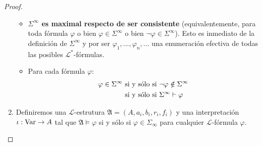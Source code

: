 \documentclass[12pt]{report}
\newcounter{it}
\theoremstyle{largebreak}
\newcommand\cf[3]{\ensuremath{#1:#2\rightarrow#3}}
\begin{document}
\begin{proof}
\begin{enumerate}[label = \textit{(\alph*)}]
\begin{itemize}
                \item \textbf{$\Sigma^\infty$ es maximal respecto de ser consistente} (equivalentemente, para toda fórmula $\varphi$ o bien $\varphi\in\Sigma^\infty$ o bien $\neg\varphi\in\Sigma^\infty$). Esto es inmediato de la definición de $\Sigma^\infty$ y por ser $\varphi_1,...,\varphi_n,...$ una enumeración efectiva de todas las posibles $\mathcal{L}^*$-fórmulas.
                \item Para cada fórmula $\varphi$:
                \begin{equation*}
                    \begin{split}
                        \varphi\in\Sigma^\infty &\textup{ si y sólo si }\neg\varphi\notin\Sigma^\infty\\
                        &\textup{ si y sólo si }\Sigma^\infty\vdash\varphi \\
                    \end{split}
                \end{equation*}
            \end{itemize}
            \item Definiremos una $\mathcal{L}$-estrutura $\mathfrak{A}=\left(A,a_i,b_i,r_i,f_i \right)$ y una interpretación $\cf{\iota}{\textup{Var}}{A}$ tal que $\mathfrak{A}\vDash\varphi$ si y sólo si $\varphi\in\Sigma_{\infty}$ para cualquier $\mathcal{L}$-fórmula $\varphi$.
            

\end{enumerate}
\end{proof}
\end{document}
